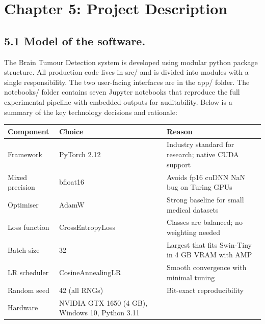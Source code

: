 \documentclass[12pt,a4paper,oneside]{report}
\begin{document}
\chapter*{}
\chapter*{Chapter 5: Project Description}
\section*{5.1 Model of the software.}
The Brain Tumour Detection system is developed using modular python package structure. All production code lives in src/ and is divided into modules with a single responsibility. The two user-facing interfaces are in the app/ folder. The notebooks/ folder contains seven Jupyter notebooks that reproduce the full experimental pipeline with embedded outputs for auditability.
Below is a summary of the key technology decisions and rationale:
\begin{center}
\small
\begin{tabularx}{\textwidth}{YYY}
\toprule
\textbf{Component} & \textbf{Choice} & \textbf{Reason} \\
\midrule
Framework & PyTorch 2.12 & Industry standard for research; native CUDA support \\
Mixed precision & bfloat16 & Avoids fp16 cuDNN NaN bug on Turing GPUs \\
Optimiser & AdamW & Strong baseline for small medical datasets \\
Loss function & CrossEntropyLoss & Classes are balanced; no weighting needed \\
Batch size & 32 & Largest that fits Swin-Tiny in 4 GB VRAM with AMP \\
LR scheduler & CosineAnnealingLR & Smooth convergence with minimal tuning \\
Random seed & 42 (all RNGs) & Bit-exact reproducibility \\
Hardware & NVIDIA GTX 1650 (4 GB), Windows 10, Python 3.11 &  \\
\bottomrule
\end{tabularx}
\end{center}
\end{document}
